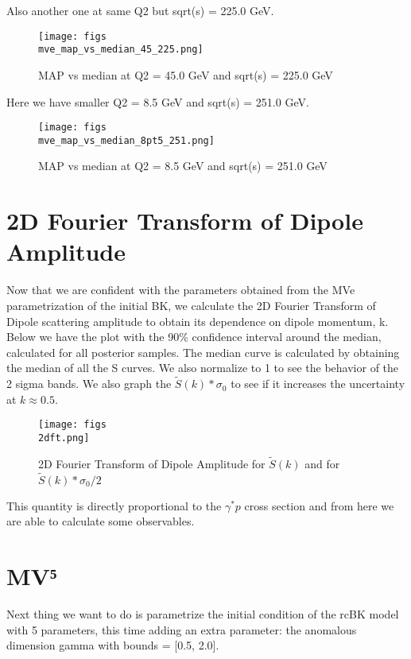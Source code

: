 \documentclass{article}
\begin{document}
Also another one at same Q2 but sqrt(s) = 225.0 GeV.

\begin{figure}
\centering
\texttt{[image: figs\\mve\_map\_vs\_median\_45\_225.png]}
\caption{MAP vs median at Q2 = 45.0 GeV and sqrt(s) = 225.0 GeV}
\label{fig:mve_map_vs_median_45_225}
\end{figure}

Here we have smaller Q2 = 8.5 GeV and sqrt(s) = 251.0 GeV.

\begin{figure}
\centering
\texttt{[image: figs\\mve\_map\_vs\_median\_8pt5\_251.png]}
\caption{MAP vs median at Q2 = 8.5 GeV and sqrt(s) = 251.0 GeV}
\label{fig:mve_map_vs_median_8pt5_251}
\end{figure}

\section{2D Fourier Transform of Dipole Amplitude}

Now that we are confident with the parameters obtained from the MVe parametrization of the initial BK, we calculate the 2D Fourier Transform of Dipole scattering amplitude to obtain its dependence on dipole momentum, k. Below we have the plot with the 90\% confidence interval around the median, calculated for all posterior samples. The median curve is calculated by obtaining the median of all the S curves. We also normalize to 1 to see the behavior of the 2 sigma bands. We also graph the $\tilde{S}(k) * \sigma_0$ to see if it increases the uncertainty at $k \approx 0.5$.

\begin{figure}
\centering
\texttt{[image: figs\\2dft.png]}
\caption{2D Fourier Transform of Dipole Amplitude for $\tilde{S}(k)$ and for $\tilde{S}(k) * \sigma_0/2$}
\label{fig:2dft}
\end{figure}

This quantity is directly proportional to the $\gamma^{*} p$ cross section and from here we are able to calculate some observables.


\section{MV⁵}
Next thing we want to do is parametrize the initial condition of the rcBK model with 5 parameters, this time adding an extra parameter: the anomalous dimension gamma with bounds = [0.5, 2.0].
\end{document}

